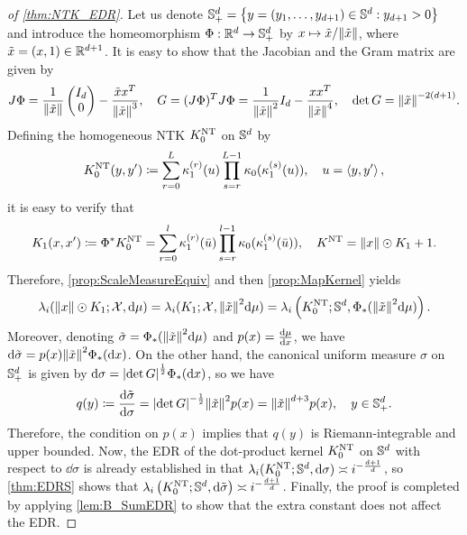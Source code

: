 \begin{proof}[of \cref{thm:NTK_EDR}]
  Let us denote $\mathbb{S}^d_+ = \left\{ y= (y_1,\dots,y_{d+1}) \in \mathbb{S}^d : y_{d+1} >0 \right\}$
  and introduce the homeomorphism $\Phi: \mathbb{R}^d \to \mathbb{S}^d_+$ by $x \mapsto \tilde{x} / \norm{\tilde{x}}$,
  where $\tilde{x} = (x,1) \in \mathbb{R}^{d+1}$.
  It is easy to show that the Jacobian and the Gram matrix are given by
  \begin{align*}
    J \Phi = \frac{1}{\norm{\tilde{x}}}
    \begin{pmatrix}
      I_d \\
      0
    \end{pmatrix}
    - \frac{\tilde{x}x^T}{\norm{\tilde{x}}^3},\quad
    G = (J\Phi)^T J \Phi = \frac{1}{\norm{\tilde{x}}^2} I_d - \frac{x x^T}{\norm{\tilde{x}}^4},\quad
    \det G = \norm{\tilde{x}}^{-2(d+1)}.
  \end{align*}
  Defining the homogeneous NTK $K^{\mathrm{NT}}_0$ on $\mathbb{S}^d$ by
  \begin{align}
    \label{eq:NTK0_Def}
    K^{\mathrm{NT}}_0(y,y') \coloneqq \sum_{r=0}^L \kappa^{(r)}_1(u) \prod_{s=r}^{L-1} \kappa_0(\kappa^{(s)}_1(u)) ,\quad u = \left\langle{y,y'}\right\rangle,
  \end{align}
  it is easy to verify that
  \begin{align*}
    K_1(x,x') \coloneqq \Phi^* K^{\mathrm{NT}}_0 = \sum_{r=0}^l \kappa^{(r)}_1(\bar{u}) \prod_{s=r}^{l-1} \kappa_0(\kappa^{(s)}_1(\bar{u})),
    \quad K^{\mathrm{NT}} = \norm{x} \odot K_1 + 1.
  \end{align*}
  Therefore, \cref{prop:ScaleMeasureEquiv} and then \cref{prop:MapKernel} yields
  \begin{align*}
    \lambda_i(\norm{x}\odot K_1;\mathcal{X},\dd \mu) =
    \lambda_i(K_1;\mathcal{X}, \norm{\tilde{x}}^2 \dd \mu) = \lambda_i\left(K^{\mathrm{NT}}_0;\mathbb{S}^d, \Phi_*( \norm{\tilde{x}}^2 \dd \mu)\right).
  \end{align*}
  Moreover, denoting $\tilde{\sigma} = \Phi_*( \norm{\tilde{x}}^2 \dd \mu)$ and $p(x) = \dv{\mu}{x}$,
  we have $\dd \tilde{\sigma} = p(x) \norm{\tilde{x}}^2 \Phi_*(\dd x)$.
  On the other hand, the canonical uniform measure $\sigma$ on $\mathbb{S}^d_+$ is given by $\dd \sigma = \abs{\det G}^{\frac{1}{2}} \Phi_*(\dd x)$,
  so we have
  \begin{align*}
    q(y) \coloneqq \dv{\tilde{\sigma}}{\sigma} =  \abs{\det G}^{-\frac{1}{2}} \norm{\tilde{x}}^2 p(x) = \norm{\tilde{x}}^{d+3} p(x),
    \quad y \in \mathbb{S}^d_+.
  \end{align*}
  Therefore, the condition on $p(x)$ implies that $q(y)$ is Riemann-integrable and upper bounded.
  Now, the EDR of the dot-product kernel $K^{\mathrm{NT}}_0$ on $\mathbb{S}^d$ with respect to $\dd \sigma$ is already established in \citet{bietti2020_DeepEquals}
  that $\lambda_i(K^{\mathrm{NT}}_0;\mathbb{S}^d,\dd \sigma) \asymp i^{-\frac{d+1}{d}}$, so \cref{thm:EDRS} shows that
  $\lambda_i\left(K^{\mathrm{NT}}_0;\mathbb{S}^d, \dd{\tilde{\sigma}} \right) \asymp i^{-\frac{d+1}{d}}$.
  Finally, the proof is completed by applying \cref{lem:B_SumEDR} to show that the extra constant does not affect the EDR\@.
\end{proof}










